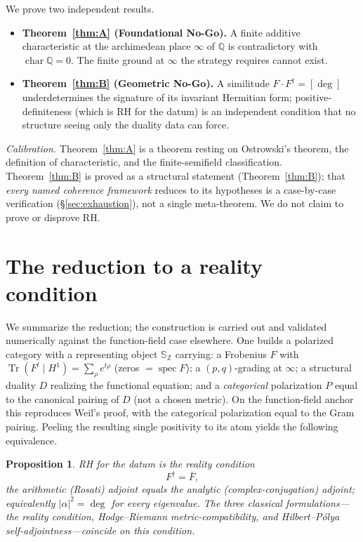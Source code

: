 \documentclass[11pt,reqno]{amsart}
\theoremstyle{plain}
\newtheorem{proposition}[theorem]{Proposition}
\theoremstyle{definition}
\theoremstyle{remark}
\newcommand{\Q}{\mathbb{Q}}
\newcommand{\Z}{\mathbb{Z}}
\newcommand{\Sph}{\mathbb{S}}
\newcommand{\dg}{^{\dagger}}
\newcommand{\spec}{\operatorname{spec}}
\newcommand{\Tr}{\operatorname{Tr}}
\newcommand{\Char}{\operatorname{char}}
\begin{document}
We prove two independent results.

\begin{itemize}
\item \textbf{Theorem~\ref{thm:A} (Foundational No-Go).} A finite additive characteristic at the archimedean
place $\infty$ of $\Q$ is contradictory with $\Char\Q=0$. The finite ground at $\infty$ the strategy requires
cannot exist.
\item \textbf{Theorem~\ref{thm:B} (Geometric No-Go).} A similitude $F\cdot F\dg=[\deg]$ underdetermines the
signature of its invariant Hermitian form; positive-definiteness (which is RH for the datum) is an
independent condition that no structure seeing only the duality data can force.
\end{itemize}

\noindent\emph{Calibration.} Theorem~\ref{thm:A} is a theorem resting on Ostrowski's theorem, the definition
of characteristic, and the finite-semifield classification. Theorem~\ref{thm:B} is proved as a structural
statement (Theorem~\ref{thm:B}); that \emph{every named coherence framework} reduces to its hypotheses is a
case-by-case verification (\S\ref{sec:exhaustion}), not a single meta-theorem. We do not claim to prove or
disprove RH.

\section{The reduction to a reality condition}\label{sec:reduction}

We summarize the reduction; the construction is carried out and validated numerically against the
function-field case elsewhere. One builds a polarized category with a representing object $\Sph_\Z$ carrying:
a Frobenius $F$ with $\Tr(F^t\mid H^1)=\sum_\rho e^{t\rho}$ (zeros $=\spec F$); a $(p,q)$-grading at $\infty$;
a structural duality $D$ realizing the functional equation; and a \emph{categorical} polarization $P$ equal
to the canonical pairing of $D$ (not a chosen metric). On the function-field anchor this reproduces Weil's
proof, with the categorical polarization equal to the Gram pairing. Peeling the resulting single positivity
to its atom yields the following equivalence.

\begin{proposition}\label{prop:reality}
RH for the datum is the \emph{reality condition}
\[
F\dg=\bar F,
\]
the arithmetic (Rosati) adjoint equals the analytic (complex-conjugation) adjoint; equivalently
$|\alpha|^2=\deg$ for every eigenvalue. The three classical formulations---the reality condition,
Hodge--Riemann metric-compatibility, and Hilbert--P\'olya self-adjointness---coincide on this condition.
\end{proposition}
\end{document}
